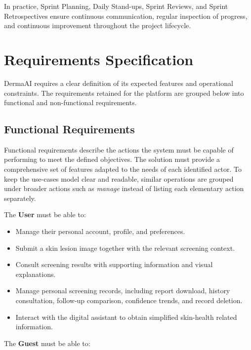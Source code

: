 	In practice, Sprint Planning, Daily Stand-ups, Sprint Reviews, and Sprint Retrospectives
	ensure continuous communication, regular inspection of progress, and continuous
	improvement throughout the project lifecycle.
	
	\section{Requirements Specification}
	
	DermaAI requires a clear definition of its expected features and operational constraints.
	The requirements retained for the platform are grouped below into functional and
	non-functional requirements.
	
	\subsection{Functional Requirements}
	
	Functional requirements describe the actions the system must be capable of performing to
	meet the defined objectives. The solution must provide a comprehensive set of features
	adapted to the needs of each identified actor. To keep the use-cases model clear and
	readable, similar operations are grouped under broader actions such as \textit{manage}
	instead of listing each elementary action separately.
	
	The \textbf{User} must be able to:
	
	\begin{itemize}
	  \item Manage their personal account, profile, and preferences.
	  \item Submit a skin lesion image together with the relevant screening context.
	  \item Consult screening results with supporting information and visual explanations.
	  \item Manage personal screening records, including report download, history
	        consultation, follow-up comparison, confidence trends, and record deletion.
	  \item Interact with the digital assistant to obtain simplified skin-health related
	        information.
	\end{itemize}
	
	The \textbf{Guest} must be able to:
	
